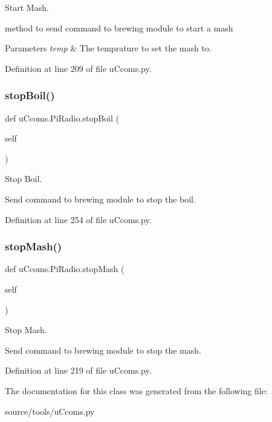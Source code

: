 Start Mash. 

method to send command to brewing module to start a mash 
\begin{DoxyParams}{Parameters}
{\em temp} & The temprature to set the mash to. \\
\hline
\end{DoxyParams}


Definition at line 209 of file u\+Ccoms.\+py.

\mbox{\label{classu_ccoms_1_1_pi_radio_aa2f56d29043646663269b11db7d8d6d0}} 
\subsubsection{\texorpdfstring{stopBoil()}{stopBoil()}}
{\footnotesize\ttfamily def u\+Ccoms.\+Pi\+Radio.\+stop\+Boil (\begin{DoxyParamCaption}\item[{}]{self }\end{DoxyParamCaption})}



Stop Boil. 

Send command to brewing module to stop the boil. 

Definition at line 254 of file u\+Ccoms.\+py.

\mbox{\label{classu_ccoms_1_1_pi_radio_afbacd87b43c6f0b6faff82fc608a7386}} 
\subsubsection{\texorpdfstring{stopMash()}{stopMash()}}
{\footnotesize\ttfamily def u\+Ccoms.\+Pi\+Radio.\+stop\+Mash (\begin{DoxyParamCaption}\item[{}]{self }\end{DoxyParamCaption})}



Stop Mash. 

Send command to brewing module to stop the mash. 

Definition at line 219 of file u\+Ccoms.\+py.



The documentation for this class was generated from the following file\+:\begin{DoxyCompactItemize}
\item 
source/tools/u\+Ccoms.\+py\end{DoxyCompactItemize}
